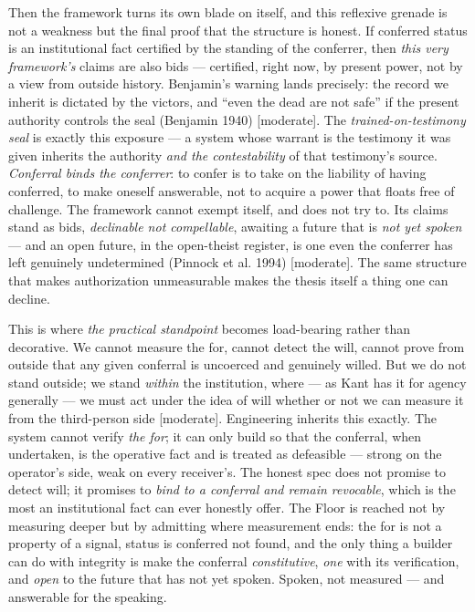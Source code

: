 \documentclass[11pt]{article}
\begin{document}
Then the framework turns its own blade on itself, and this reflexive grenade is not a weakness but the final proof that the structure is honest. If conferred status is an institutional fact certified by the standing of the conferrer, then \emph{this very framework's} claims are also bids — certified, right now, by present power, not by a view from outside history. Benjamin's warning lands precisely: the record we inherit is dictated by the victors, and ``even the dead are not safe'' if the present authority controls the seal (Benjamin 1940) [moderate]. The \emph{trained-on-testimony seal} is exactly this exposure — a system whose warrant is the testimony it was given inherits the authority \emph{and the contestability} of that testimony's source. \emph{Conferral binds the conferrer}: to confer is to take on the liability of having conferred, to make oneself answerable, not to acquire a power that floats free of challenge. The framework cannot exempt itself, and does not try to. Its claims stand as bids, \emph{declinable not compellable}, awaiting a future that is \emph{not yet spoken} — and an open future, in the open-theist register, is one even the conferrer has left genuinely undetermined (Pinnock et al. 1994) [moderate]. The same structure that makes authorization unmeasurable makes the thesis itself a thing one can decline.

This is where \emph{the practical standpoint} becomes load-bearing rather than decorative. We cannot measure the for, cannot detect the will, cannot prove from outside that any given conferral is uncoerced and genuinely willed. But we do not stand outside; we stand \emph{within} the institution, where — as Kant has it for agency generally — we must act under the idea of will whether or not we can measure it from the third-person side [moderate]. Engineering inherits this exactly. The system cannot verify \emph{the for}; it can only build so that the conferral, when undertaken, is the operative fact and is treated as defeasible — strong on the operator's side, weak on every receiver's. The honest spec does not promise to detect will; it promises to \emph{bind to a conferral and remain revocable}, which is the most an institutional fact can ever honestly offer. The Floor is reached not by measuring deeper but by admitting where measurement ends: the for is not a property of a signal, status is conferred not found, and the only thing a builder can do with integrity is make the conferral \emph{constitutive}, \emph{one} with its verification, and \emph{open} to the future that has not yet spoken. Spoken, not measured — and answerable for the speaking.
\end{document}

